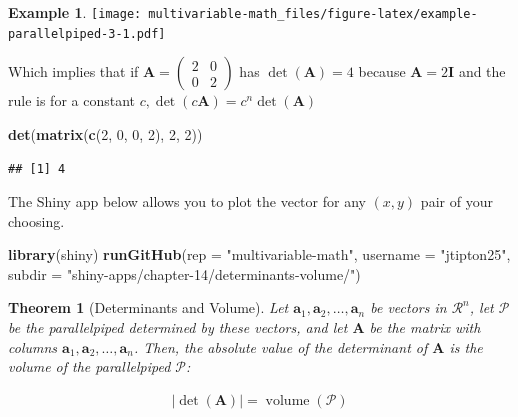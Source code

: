 \documentclass[
]{book}
\newenvironment{Shaded}{\begin{snugshade}}{\end{snugshade}}
\newcommand{\DataTypeTok}[1]{\textcolor[rgb]{0.13,0.29,0.53}{#1}}
\newcommand{\DecValTok}[1]{\textcolor[rgb]{0.00,0.00,0.81}{#1}}
\newcommand{\KeywordTok}[1]{\textcolor[rgb]{0.13,0.29,0.53}{\textbf{#1}}}
\newcommand{\NormalTok}[1]{#1}
\newcommand{\StringTok}[1]{\textcolor[rgb]{0.31,0.60,0.02}{#1}}
\newtheorem{theorem}{Theorem}[chapter]
\theoremstyle{definition}
\theoremstyle{definition}
\newtheorem{example}{Example}[chapter]
\theoremstyle{definition}
\theoremstyle{definition}
\theoremstyle{remark}
\begin{document}
\begin{example}
\texttt{[image: multivariable-math\_files/figure-latex/example-parallelpiped-3-1.pdf]}

Which implies that if \(\mathbf{A} = \begin{pmatrix} 2 & 0 \\ 0 & 2 \end{pmatrix}\) has \(\det(\mathbf{A}) = 4\) because \(\mathbf{A} = 2 \mathbf{I}\) and the rule is for a constant \(c, \det(c\mathbf{A}) = c^n \det(\mathbf{A})\)

\begin{Shaded}
\begin{Highlighting}[]
\KeywordTok{det}\NormalTok{(}\KeywordTok{matrix}\NormalTok{(}\KeywordTok{c}\NormalTok{(}\DecValTok{2}\NormalTok{, }\DecValTok{0}\NormalTok{, }\DecValTok{0}\NormalTok{, }\DecValTok{2}\NormalTok{), }\DecValTok{2}\NormalTok{, }\DecValTok{2}\NormalTok{))}
\end{Highlighting}
\end{Shaded}

\begin{verbatim}
## [1] 4
\end{verbatim}

\end{example}

The Shiny app below allows you to plot the vector for any \((x, y)\) pair of your choosing.

\begin{Shaded}
\begin{Highlighting}[]
\KeywordTok{library}\NormalTok{(shiny)}
\KeywordTok{runGitHub}\NormalTok{(}\DataTypeTok{rep =} \StringTok{"multivariable-math"}\NormalTok{,}
          \DataTypeTok{username =} \StringTok{"jtipton25"}\NormalTok{,}
          \DataTypeTok{subdir =} \StringTok{"shiny-apps/chapter-14/determinants-volume/"}\NormalTok{) }
\end{Highlighting}
\end{Shaded}

\begin{theorem}[Determinants and Volume]
Let \(\mathbf{a}_1, \mathbf{a}_2, \ldots, \mathbf{a}_n\) be vectors in \(\mathcal{R}^n\), let \(\mathcal{P}\) be the parallelpiped determined by these vectors, and let \(\mathbf{A}\) be the matrix with columns \(\mathbf{a}_1, \mathbf{a}_2, \ldots, \mathbf{a}_n\). Then, the absolute value of the determinant of \(\mathbf{A}\) is the volume of the parallelpiped \(\mathcal{P}\):

\[
\begin{aligned}
|\det(\mathbf{A})| = \operatorname{volume}(\mathcal{P})
\end{aligned}
\]
\end{theorem}
\end{document}
